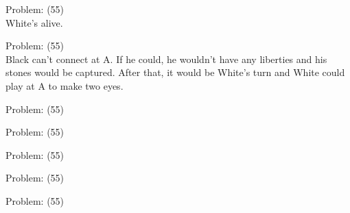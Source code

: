 \documentclass[11pt]{article}
\begin{document}
\begin{minipage}[t]{0.5\textwidth}
  {\centering
  
  Problem: (55)\\
  White's alive.\\
  }
\end{minipage}
\begin{minipage}[t]{0.5\textwidth}
  {\centering
  
  Problem: (55)\\
  Black can't connect at A. If he could, he wouldn't have any liberties and his stones would be captured. After that, it would be White’s turn and White could play at A to make two eyes.\\
  }
\end{minipage}
\begin{minipage}[t]{0.5\textwidth}
  {\centering
  
  Problem: (55)\\
  
  }
\end{minipage}
\begin{minipage}[t]{0.5\textwidth}
  {\centering
  
  Problem: (55)\\
  
  }
\end{minipage}
\begin{minipage}[t]{0.5\textwidth}
  {\centering
  
  Problem: (55)\\
  
  }
\end{minipage}
\begin{minipage}[t]{0.5\textwidth}
  {\centering
  
  Problem: (55)\\
  
  }
\end{minipage}
\begin{minipage}[t]{0.5\textwidth}
  {\centering
  
  Problem: (55)\\
  
  }
\end{minipage}
\end{document}
